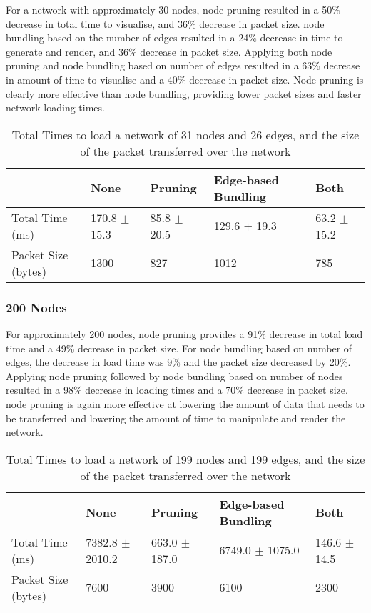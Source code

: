 \documentclass[../dissertation.tex]{subfiles}
\begin{document}
For a network with approximately 30 nodes, node pruning resulted in a 50\% decrease in total time to visualise, and 36\% decrease in packet size. node bundling based on the number of edges resulted in a 24\% decrease in time to generate and render, and 36\% decrease in packet size. Applying both node pruning and node bundling based on number of edges resulted in a 63\% decrease in amount of time to visualise and a 40\% decrease in packet size. Node pruning is clearly more effective than node bundling, providing lower packet sizes and faster network loading times.

\begin{table}[H]
\centering
\begin{tabular}{|l|l|l|l|l|}
\hline
                    & \textbf{None}    & \textbf{Pruning} & \textbf{Edge-based Bundling}    & \textbf{Both}   \\ \hline
Total Time (ms)     & 170.8 $\pm$ 15.3 & 85.8 $\pm$ 20.5  & 129.6 $\pm$ 19.3 & 63.2 $\pm$ 15.2 \\ \hline
Packet Size (bytes) & 1300             & 827              & 1012             & 785             \\ \hline
\end{tabular}
\caption{Total Times to load a network of 31 nodes and 26 edges, and the size of the packet transferred over the network}
\label{table:30-nodes}
\end{table}

\subsubsection{200 Nodes}

For approximately 200 nodes, node pruning provides a 91\% decrease in total load time and a 49\% decrease in packet size. For node bundling based on number of edges, the decrease in load time was 9\% and the packet size decreased by 20\%. Applying node pruning followed by node bundling based on number of nodes resulted in a 98\% decrease in loading times and a 70\% decrease in packet size. node pruning is again more effective at lowering the amount of data that needs to be transferred and lowering the amount of time to manipulate and render the network.

\begin{table}[H]
\centering
\begin{tabular}{|l|l|l|l|l|}
\hline
                    & \textbf{None}       & \textbf{Pruning}  & \textbf{Edge-based Bundling}       & \textbf{Both}    \\ \hline
Total Time (ms)     & 7382.8 $\pm$ 2010.2 & 663.0 $\pm$ 187.0 & 6749.0 $\pm$ 1075.0 & 146.6 $\pm$ 14.5 \\ \hline
Packet Size (bytes) & 7600                & 3900              & 6100                & 2300             \\ \hline
\end{tabular}
\caption{Total Times to load a network of 199 nodes and 199 edges, and the size of the packet transferred over the network}
\label{table:200-nodes}
\end{table}
\end{document}
